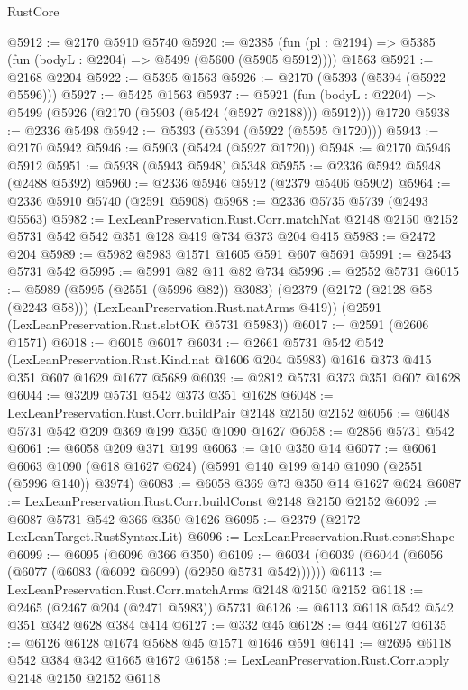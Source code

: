 \begin{lexlean}{RustCore}
\begin{coremodule}
@5912 := @2170 @5910 @5740
@5920 := @2385
    (fun (pl : @2194) => @5385 (fun (bodyL : @2204) => @5499 (@5600 (@5905 @5912))))
    @1563
@5921 := @2168 @2204
@5922 := @5395 @1563
@5926 := @2170 (@5393 (@5394 (@5922 @5596)))
@5927 := @5425 @1563
@5937 := @5921
    (fun (bodyL : @2204) => @5499 (@5926 (@2170 (@5903 (@5424 (@5927 @2188))) @5912)))
    @1720
@5938 := @2336 @5498
@5942 := @5393 (@5394 (@5922 (@5595 @1720)))
@5943 := @2170 @5942
@5946 := @5903 (@5424 (@5927 @1720))
@5948 := @2170 @5946 @5912
@5951 := @5938 (@5943 @5948) @5348
@5955 := @2336 @5942 @5948 (@2488 @5392)
@5960 := @2336 @5946 @5912 (@2379 @5406 @5902)
@5964 := @2336 @5910 @5740 (@2591 @5908)
@5968 := @2336 @5735 @5739 (@2493 @5563)
@5982 := LexLeanPreservation.Rust.Corr.matchNat
    @2148
    @2150
    @2152
    @5731
    @542
    @542
    @351
    @128
    @419
    @734
    @373
    @204
    @415
@5983 := @2472 @204
@5989 := @5982 @5983 @1571 @1605 @591 @607 @5691
@5991 := @2543 @5731 @542
@5995 := @5991 @82 @11 @82 @734
@5996 := @2552 @5731
@6015 := @5989
    (@5995 (@2551 (@5996 @82)) @3083)
    (@2379 (@2172 (@2128 @58 (@2243 @58))) (LexLeanPreservation.Rust.natArms @419))
    (@2591 (LexLeanPreservation.Rust.slotOK @5731 @5983))
@6017 := @2591 (@2606 @1571)
@6018 := @6015 @6017
@6034 := @2661
    @5731
    @542
    @542
    (LexLeanPreservation.Rust.Kind.nat @1606 @204 @5983)
    @1616
    @373
    @415
    @351
    @607
    @1629
    @1677
    @5689
@6039 := @2812 @5731 @373 @351 @607 @1628
@6044 := @3209 @5731 @542 @373 @351 @1628
@6048 := LexLeanPreservation.Rust.Corr.buildPair @2148 @2150 @2152
@6056 := @6048 @5731 @542 @209 @369 @199 @350 @1090 @1627
@6058 := @2856 @5731 @542
@6061 := @6058 @209 @371 @199
@6063 := @10 @350 @14
@6077 := @6061 @6063 @1090 (@618 @1627 @624) (@5991 @140 @199 @140 @1090 (@2551 (@5996 @140)) @3974)
@6083 := @6058 @369 @73 @350 @14 @1627 @624
@6087 := LexLeanPreservation.Rust.Corr.buildConst @2148 @2150 @2152
@6092 := @6087 @5731 @542 @366 @350 @1626
@6095 := @2379 (@2172 LexLeanTarget.RustSyntax.Lit)
@6096 := LexLeanPreservation.Rust.constShape
@6099 := @6095 (@6096 @366 @350)
@6109 := @6034 (@6039 (@6044 (@6056 (@6077 (@6083 (@6092 @6099) (@2950 @5731 @542))))))
@6113 := LexLeanPreservation.Rust.Corr.matchArms @2148 @2150 @2152
@6118 := @2465 (@2467 @204 (@2471 @5983)) @5731
@6126 := @6113 @6118 @542 @542 @351 @342 @628 @384 @414
@6127 := @332 @45
@6128 := @44 @6127
@6135 := @6126 @6128 @1674 @5688 @45 @1571 @1646 @591
@6141 := @2695 @6118 @542 @384 @342 @1665 @1672
@6158 := LexLeanPreservation.Rust.Corr.apply
    @2148
    @2150
    @2152
    @6118

\end{coremodule}
\end{lexlean}
